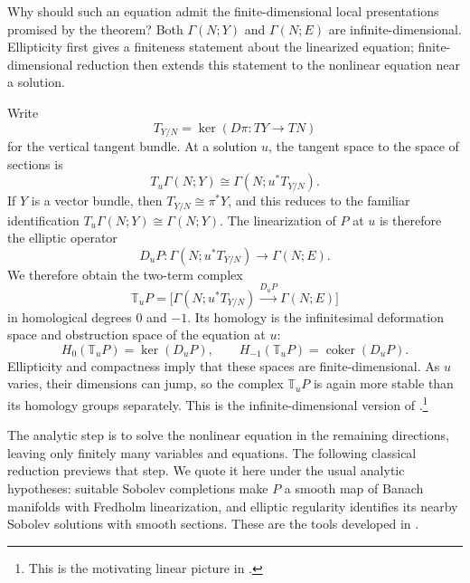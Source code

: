 Why should such an equation admit the finite-dimensional local presentations
promised by the theorem? Both $\Gamma(N;Y)$ and $\Gamma(N;E)$ are
infinite-dimensional. Ellipticity first gives a finiteness statement about
the linearized equation; finite-dimensional reduction then extends this
statement to the nonlinear equation near a solution.

Write
\[
  T_{Y/N}
  =\ker(D\pi\colon TY\longrightarrow TN)
\]
for the vertical tangent bundle. At a solution $u$, the tangent space to the
space of sections is
\[
  T_u\Gamma(N;Y)\cong\Gamma(N;u^*T_{Y/N}).
\]
If $Y$ is a vector bundle, then $T_{Y/N}\cong\pi^*Y$, and this
reduces to the familiar identification $T_u\Gamma(N;Y)\cong\Gamma(N;Y)$.
The linearization of $P$ at $u$ is therefore the elliptic operator
\[
  D_uP\colon
  \Gamma(N;u^*T_{Y/N})
  \longrightarrow
  \Gamma(N;E).
\]
We therefore obtain the two-term complex
\[
  \mathbb{T}_uP
  =\bigl[
      \Gamma(N;u^*T_{Y/N})
      \xrightarrow{D_uP}
      \Gamma(N;E)
    \bigr]
\]
in homological degrees $0$ and $-1$. Its homology is the infinitesimal
deformation space and obstruction space of the equation at $u$:
\[
  H_0(\mathbb{T}_uP)=\ker(D_uP),
  \qquad
  H_{-1}(\mathbb{T}_uP)=\operatorname{coker}(D_uP).
\]
Ellipticity and compactness imply that these spaces are finite-dimensional.
As $u$ varies, their dimensions can jump, so the complex $\mathbb{T}_uP$ is
again more stable than its homology groups separately. This is the
infinite-dimensional version of .\footnote{
  This is the motivating linear picture in
  \cite[Sections~1--2]{Pardon_Representability_Elliptic_Fredholm}.}

The analytic step is to solve the nonlinear equation in the remaining
directions, leaving only finitely many variables and equations. The following
classical reduction previews that step. We quote it here under the usual
analytic hypotheses: suitable Sobolev completions make $P$ a smooth map of
Banach manifolds with Fredholm linearization, and elliptic regularity
identifies its nearby Sobolev solutions with smooth sections. These are the
tools developed in .


